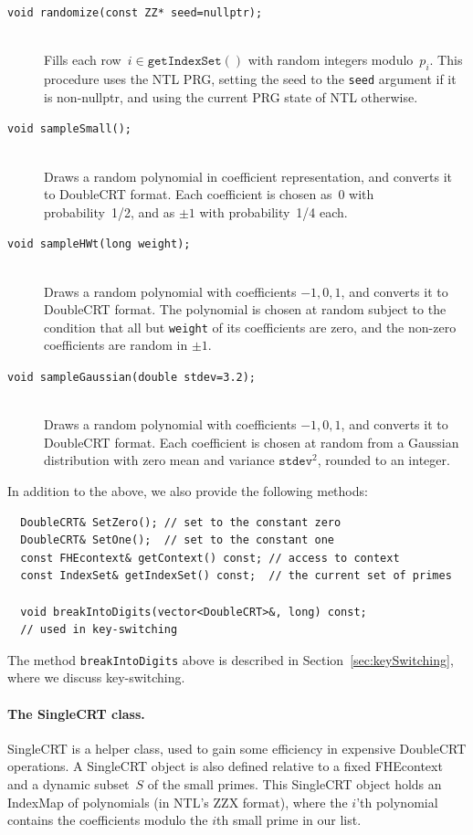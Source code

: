 \documentclass[14pt]{extarticle}
\newcommand{\secref}[1]{Section~\protect\ref{sec:#1}}
\def\IndexMap{\textsf{IndexMap}}
\def\SingleCRT{\textsf{SingleCRT}}
\def\DoubleCRT{\textsf{DoubleCRT}}
\def\FHEcontext{\textsf{FHEcontext}}
\begin{document}
\begin{description}
\item[\texttt{void randomize(const ZZ* seed=nullptr);}]\ \\
Fills each row~$i\in\mathtt{getIndexSet()}$ with random integers 
modulo~$p_i$. This procedure uses the NTL PRG, setting the seed
to the \texttt{seed} argument if it is non-nullptr, and using the
current PRG state of NTL otherwise.

\item[\texttt{void sampleSmall();}]\ \\
Draws a random polynomial in coefficient representation, and converts
it to {\DoubleCRT} format. Each coefficient is chosen as~0 with
probability~1/2,  and as $\pm 1$ with probability~1/4 each.


\item[\texttt{void sampleHWt(long weight);}]\ \\
Draws a random polynomial with coefficients $-1,0,1$, and converts
it to {\DoubleCRT} format. The polynomial is chosen at random subject
to the condition that all but \texttt{weight} of its coefficients
are zero, and the non-zero coefficients are random in $\pm 1$.

\item[\texttt{void sampleGaussian(double stdev=3.2);}]\ \\
Draws a random polynomial with coefficients $-1,0,1$, and converts
it to {\DoubleCRT} format. Each coefficient is chosen at random from
a Gaussian distribution with zero mean and variance $\mathtt{stdev}^2$,
rounded to an integer.
\end{description}

\noindent
In addition to the above, we also provide the following methods:
\begin{verbatim}
  DoubleCRT& SetZero(); // set to the constant zero
  DoubleCRT& SetOne();  // set to the constant one
  const FHEcontext& getContext() const; // access to context
  const IndexSet& getIndexSet() const;  // the current set of primes

  void breakIntoDigits(vector<DoubleCRT>&, long) const; 
  // used in key-switching
\end{verbatim}
The method \texttt{breakIntoDigits} above is described in
\secref{keySwitching}, where we discuss key-switching.

\paragraph{The {\SingleCRT} class.}\label{sec:SingleCRT}
{\SingleCRT} is a helper class, used to gain some efficiency in
expensive {\DoubleCRT} operations. A {\SingleCRT} object is also defined
relative to a fixed {\FHEcontext} and a dynamic subset~$S$ of the small
primes. This {\SingleCRT} object holds an {\IndexMap} of polynomials
(in NTL's ZZX format), where the $i$'th polynomial contains the
coefficients modulo the $i$th small prime in our list.
\end{document}
